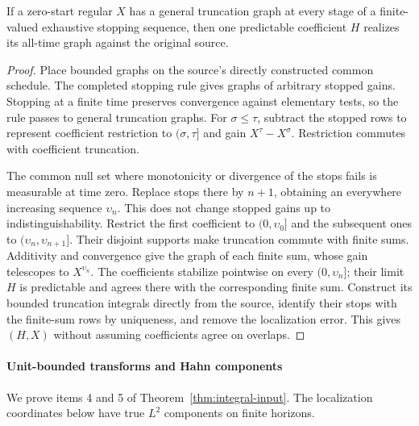 \begin{proposition}
If a zero-start regular $X$ has a general truncation graph at every stage of
a finite-valued exhaustive stopping sequence, then one predictable coefficient
$H$ realizes its all-time graph against the original source.
\end{proposition}
\begin{proof}
Place bounded graphs on the source's directly constructed common schedule.
The completed stopping rule gives graphs of arbitrary stopped gains.
Stopping at a finite time preserves convergence against elementary tests,
so the rule passes
to general truncation graphs. For $\sigma\leq\tau$, subtract the stopped
rows to represent coefficient restriction to $(\sigma,\tau]$ and gain
$X^\tau-X^\sigma$. Restriction commutes with coefficient truncation.

The common null set where monotonicity or divergence of the stops fails is
measurable at time zero. Replace stops there by $n+1$, obtaining an everywhere
increasing sequence $\upsilon_n$. This does not change stopped gains up to
indistinguishability. Restrict the first coefficient to $(0,\upsilon_0]$ and
the subsequent ones to $(\upsilon_n,\upsilon_{n+1}]$. Their disjoint supports
make truncation commute with finite sums. Additivity and convergence give
the graph of each finite sum, whose gain telescopes to $X^{\upsilon_n}$.
The coefficients stabilize pointwise on every $(0,\upsilon_n]$; their limit
$H$ is predictable and agrees there with the corresponding finite sum.
Construct its bounded truncation integrals directly from the source, identify
their stops with the finite-sum rows by uniqueness, and remove the localization
error. This gives $(H,X)$ without assuming coefficients agree on overlaps.
\end{proof}

\paragraph{Unit-bounded transforms and Hahn components}
We prove items 4 and 5 of Theorem~\ref{thm:integral-input}. The localization coordinates below have true $L^2$ components on finite horizons.

